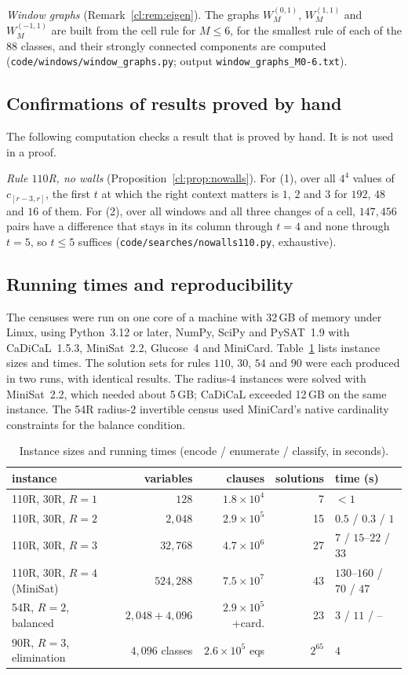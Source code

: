 \emph{Window graphs} (Remark~\ref{cl:rem:eigen}). The graphs $W^{(0,1)}_M$, $W^{(1,1)}_M$ and $W^{(-1,1)}_M$ are built from the cell rule for $M\le6$, for the smallest rule of each of the $88$ classes, and their strongly connected components are computed (\texttt{code/windows/window\_graphs.py}; output \texttt{window\_graphs\_M0-6.txt}).

\subsection{Confirmations of results proved by hand}\label{app:confirm}

The following computation checks a result that is proved by hand. It is not used in a proof.

\emph{Rule $110$R, no walls} (Proposition~\ref{cl:prop:nowalls}). For (1), over all $4^4$ values of $c_{[r-3,r]}$, the first $t$ at which the right context matters is $1$, $2$ and $3$ for $192$, $48$ and $16$ of them. For (2), over all windows and all three changes of a cell, $147{,}456$ pairs have a difference that stays in its column through $t=4$ and none through $t=5$, so $t\le5$ suffices (\texttt{code/searches/nowalls110.py}, exhaustive).

\subsection{Running times and reproducibility}\label{app:repro}

The censuses were run on one core of a machine with 32\,GB of memory under Linux, using Python~3.12 or later, NumPy, SciPy and PySAT~1.9 with CaDiCaL~1.5.3, MiniSat~2.2, Glucose~4 and MiniCard. Table~\ref{tab:times} lists instance sizes and times. The solution sets for rules $110$, $30$, $54$ and $90$ were each produced in two runs, with identical results. The radius-$4$ instances were solved with MiniSat~2.2, which needed about 5\,GB; CaDiCaL exceeded 12\,GB on the same instance. The 54R radius-$2$ invertible census used MiniCard's native cardinality constraints for the balance condition.

\begin{table}[h]
\caption{Instance sizes and running times (encode / enumerate / classify, in seconds).}
\label{tab:times}
\centering
\begin{tabular}{lrrrl}
\toprule
instance & variables & clauses & solutions & time (s)\\
\midrule
110R, 30R, $R=1$ & $128$ & $1.8\times10^4$ & 7 & $<1$\\
110R, 30R, $R=2$ & $2{,}048$ & $2.9\times10^5$ & 15 & $0.5$ / $0.3$ / $1$\\
110R, 30R, $R=3$ & $32{,}768$ & $4.7\times10^6$ & 27 & $7$ / $15$--$22$ / $33$\\
110R, 30R, $R=4$ (MiniSat) & $524{,}288$ & $7.5\times10^7$ & 43 & $130$--$160$ / $70$ / $47$\\
54R, $R=2$, balanced & $2{,}048+4{,}096$ & $2.9\times10^5$+card. & 23 & $3$ / $11$ / --\\
90R, $R=3$, elimination & $4{,}096$ classes & $2.6\times10^5$ eqs & $2^{65}$ & $4$\\
\bottomrule
\end{tabular}
\end{table}

